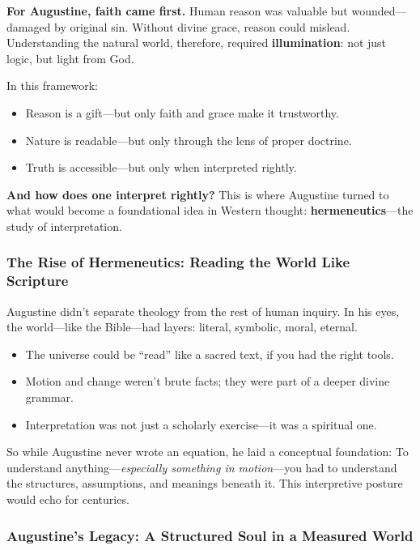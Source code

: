 \textbf{For Augustine, faith came first.} Human reason was valuable but wounded—damaged by original sin. Without divine grace, reason could mislead. Understanding the natural world, therefore, required \textbf{illumination}: not just logic, but light from God.

\medskip

\noindent In this framework:
\begin{itemize}
  \item Reason is a gift—but only faith and grace make it trustworthy.
  \item Nature is readable—but only through the lens of proper doctrine.
  \item Truth is accessible—but only when interpreted rightly.
\end{itemize}

\textbf{And how does one interpret rightly?} This is where Augustine turned to what would become a foundational idea in Western thought: \textbf{hermeneutics}—the study of interpretation.

\subsubsection{The Rise of Hermeneutics: Reading the World Like Scripture}

Augustine didn’t separate theology from the rest of human inquiry. In his eyes, the world—like the Bible—had layers: literal, symbolic, moral, eternal.

\begin{itemize}
  \item The universe could be “read” like a sacred text, if you had the right tools.
  \item Motion and change weren’t brute facts; they were part of a deeper divine grammar.
  \item Interpretation was not just a scholarly exercise—it was a spiritual one.
\end{itemize}

So while Augustine never wrote an equation, he laid a conceptual foundation:  
To understand anything—\textit{especially something in motion}—you had to understand the structures, assumptions, and meanings beneath it.  
This interpretive posture would echo for centuries.

\subsubsection{Augustine’s Legacy: A Structured Soul in a Measured World}

